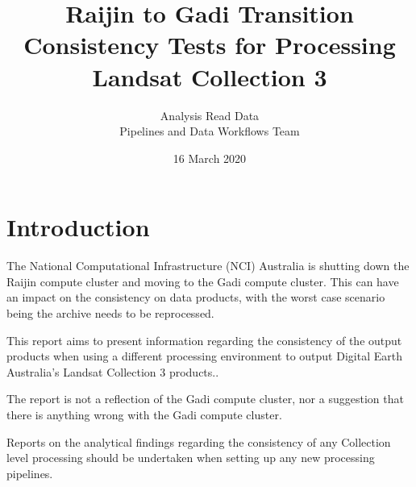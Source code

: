 \documentclass[a4paper]{article}
\title{Raijin to Gadi Transition Consistency Tests for Processing Landsat Collection 3}
\date{16 March 2020}
\author{Analysis Read Data\\ Pipelines and Data Workflows Team}
\begin{document}
  \maketitle
  \newpage

  \section{Introduction}

    \begin{flushleft}
      The National Computational Infrastructure (NCI) Australia is shutting down the Raijin compute cluster and moving to the Gadi compute cluster. This can have an impact on the consistency on data products, with the worst case scenario being the archive needs to be reprocessed. \par
      This report aims to present information regarding the consistency of the output products when using a different processing environment to output Digital Earth Australia's Landsat Collection 3 products.. \par
      The report is not a reflection of the Gadi compute cluster, nor a suggestion that there is anything wrong with the Gadi compute cluster. \par
      Reports on the analytical findings regarding the consistency of any Collection level processing should be undertaken when setting up any new processing pipelines.
    \end{flushleft}
\end{document}
